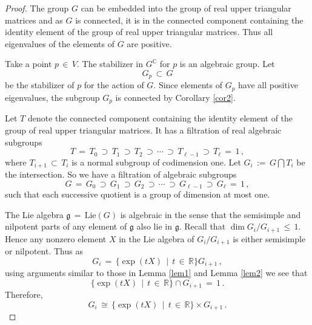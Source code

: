 \documentclass[12pt]{amsart}
\begin{document}
\begin{proof}
The group $G$ can be embedded into the group of real upper triangular
matrices and as $G$ is connected, it is in the connected component
containing the identity element of the group of real upper triangular
matrices. Thus all eigenvalues of the elements of $G$ are positive.

Take a point $p\, \in\, V$. The stabilizer in $G^{\mathbb{C}}$ for $p$ is an
algebraic group. Let
\begin{equation*}
G_p\, \subset\, G
\end{equation*}
be the stabilizer of $p$ for the action of $G$. Since elements of $G_p$ have
all positive eigenvalues, the subgroup $G_p$ is connected by Corollary \ref{cor2}.

Let $T$ denote the connected component containing the identity element of
the group of real upper triangular matrices. It has a filtration of real
algebraic subgroups
\begin{equation*}
T\,=\, T_0\, \supset\, T_1\, \supset\, T_2 \, \supset\,\cdots \, \supset\,
T_{\ell-1} \, \supset\, T_\ell\,=\, 1\, ,
\end{equation*}
where $T_{i+1}\, \subset\, T_i$ is a normal subgroup of codimension one. Let
$G_i\,:=\, G\bigcap T_i$ be the intersection. So we have a filtration of
algebraic subgroups
\begin{equation*}
G\,=\, G_0\, \supset\, G_1\, \supset\, G_2 \, \supset\,\cdots \, \supset\,
G_{\ell-1} \, \supset\, G_\ell\,=\, 1\, ,
\end{equation*}
such that each successive quotient is a group of dimension at most one.

The Lie algebra ${\mathfrak{g}}\,=\, \text{Lie}(G)$ is algebraic in the
sense that the semisimple and nilpotent parts of any element of
${\mathfrak{g}}$ also lie in ${\mathfrak{g}}$. Recall that $\dim G_i/G_{i+1}\,
\leq\, 1$. Hence any nonzero element $X$ in the Lie algebra of $G_i/G_{i+1}$ is
either semisimple or nilpotent. Thus as
\begin{equation*}
G_i\,=\, \{\exp(tX)\,\mid\, t\,\in\,{\mathbb{R}}\}G_{i+1}\, ,
\end{equation*}
using arguments similar to those in Lemma \ref{lem1} and Lemma \ref{lem2} we
see that
\begin{equation*}
\{\exp(tX)\,\mid\, t\,\in\,{\mathbb{R}}\}\cap G_{i+1}\,=\, 1\, .
\end{equation*}
Therefore,
\begin{equation*}
G_i\,\cong\, \{\exp(tX)\,\mid\, t\,\in\,{\mathbb{R}}\}\times G_{i+1}\, .
\end{equation*}


\end{proof}
\end{document}

